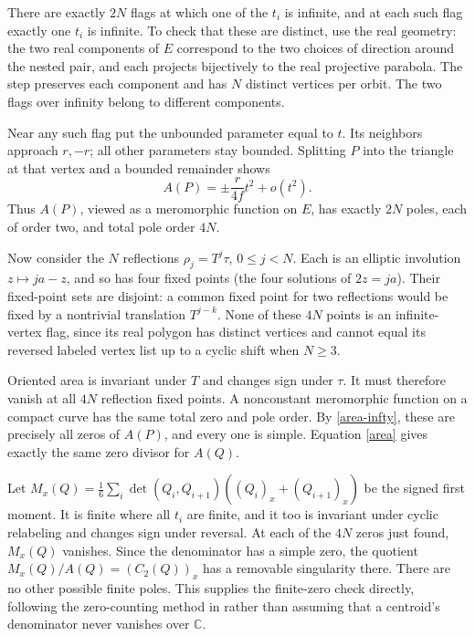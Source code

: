 \documentclass[11pt]{article}
\newcommand{\C}{\mathbb C}
\begin{document}
There are exactly $2N$ flags at which one of the $t_i$ is infinite,
and at each such flag exactly one $t_i$ is infinite. To check that
these are distinct, use the real geometry: the two real components
of $E$ correspond to the two choices of direction around the nested
pair, and each projects bijectively to the real projective parabola.
The step preserves each component and has $N$ distinct vertices per
orbit. The two flags over infinity belong to different components.

Near any such flag put the unbounded parameter equal to $t$.
Its neighbors approach $r,-r$; all other parameters stay bounded.
Splitting $P$ into the triangle at that vertex and a bounded
remainder shows
\begin{equation}\label{area-infty}
 A(P)=\pm\frac{r}{4f}t^2+o(t^2).
\end{equation}
Thus $A(P)$, viewed as a meromorphic function on $E$, has exactly
$2N$ poles, each of order two, and total pole order $4N$.

Now consider the $N$ reflections $\rho_j=T^j\tau$,
$0\leq j<N$. Each is an elliptic involution $z\mapsto ja-z$,
and so has four fixed points (the four solutions of $2z=ja$).
Their fixed-point sets are disjoint: a common fixed point for two
reflections would be fixed by a nontrivial translation $T^{j-k}$.
None of these $4N$ points is an infinite-vertex flag, since its real
polygon has distinct vertices and cannot equal its reversed labeled
vertex list up to a cyclic shift when $N\geq3$.

Oriented area is invariant under $T$ and changes sign under $\tau$.
It must therefore vanish at all $4N$ reflection fixed points.
A nonconstant meromorphic function on a compact curve has the same
total zero and pole order. By \eqref{area-infty}, these are precisely
all zeros of $A(P)$, and every one is simple. Equation \eqref{area}
gives exactly the same zero divisor for $A(Q)$.

Let $M_x(Q)=\frac16\sum_i\det(Q_i,Q_{i+1})
((Q_i)_x+(Q_{i+1})_x)$ be the signed first moment. It is finite
where all $t_i$ are finite, and it too is invariant under cyclic
relabeling and changes sign under reversal. At each of the $4N$
zeros just found, $M_x(Q)$ vanishes. Since the denominator has a
simple zero, the quotient $M_x(Q)/A(Q)=(C_2(Q))_x$ has a removable
singularity there. There are no other possible finite poles.
This supplies the finite-zero check directly, following the
zero-counting method in \cite{CC} rather than assuming that a
centroid's denominator never vanishes over $\C$.
\end{document}
